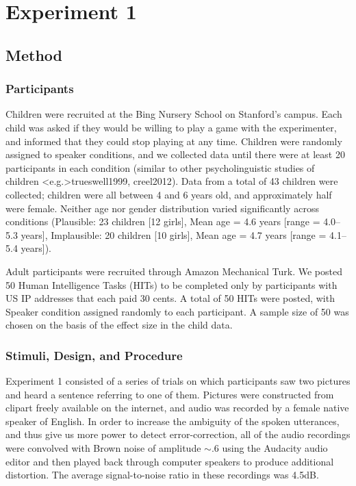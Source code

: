 \documentclass[man,floatsintext]{apa6}
\begin{document}
\section{Experiment 1}

\subsection{Method}
\subsubsection{Participants}

Children were recruited at the Bing Nursery School on Stanford's campus. Each child was asked if they would be willing to play a game with the experimenter, and informed that they could stop playing at any time. Children were randomly assigned to speaker conditions, and we collected data until there were at least 20 participants in each condition (similar to other psycholinguistic studies of children \citeNP<e.g.>{trueswell1999, creel2012}). Data from a total of 43 children were collected; children were all between 4 and 6 years old, and approximately half were female. Neither age nor gender distribution varied significantly across conditions (Plausible: 23 children [12 girls], Mean age = 4.6 years [range = 4.0--5.3 years], Implausible: 20 children [10 girls], Mean age = 4.7 years [range = 4.1--5.4 years]).

Adult participants were recruited through Amazon Mechanical Turk. We posted 50 Human Intelligence Tasks (HITs) to be completed only by participants with US IP addresses that each paid 30 cents. A total of 50 HITs were posted, with Speaker condition assigned randomly to each participant. A sample size of 50 was chosen on the basis of the effect size in the child data.

\subsubsection{Stimuli, Design, and Procedure}

Experiment 1 consisted of a series of trials on which participants saw two pictures and heard a sentence referring to one of them. Pictures were constructed from clipart freely available on the internet, and audio was recorded by a female native speaker of English. In order to increase the ambiguity of the spoken utterances, and thus give us more power to detect error-correction, all of the audio recordings were convolved with Brown noise of amplitude $\sim$.6 using the Audacity audio editor and then played back through computer speakers to produce additional distortion. The average signal-to-noise ratio in these recordings was 4.5dB. 
\end{document}
